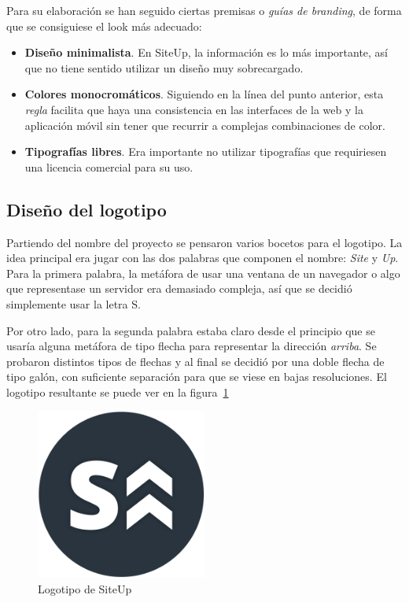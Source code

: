 Para su elaboración se han seguido ciertas premisas o \textit{guías de
  branding}, de forma que se consiguiese el look más adecuado:

\begin{itemize}
\item \textbf{Diseño minimalista}. En SiteUp, la información es lo más
  importante, así que no tiene sentido utilizar un diseño muy sobrecargado.
\item \textbf{Colores monocromáticos}. Siguiendo en la línea del punto anterior,
  esta \textit{regla} facilita que haya una consistencia en las interfaces de la
  web y la aplicación móvil sin tener que recurrir a complejas combinaciones de
  color.
\item \textbf{Tipografías libres}. Era importante no utilizar tipografías que
  requiriesen una licencia comercial para su uso.
\end{itemize}

\subsection{Diseño del logotipo}
\label{subsec:logotipo}

Partiendo del nombre del proyecto se pensaron varios bocetos para el
logotipo. La idea principal era jugar con las dos palabras que componen el
nombre: \textit{Site} y \textit{Up}. Para la primera palabra, la metáfora de
usar una ventana de un navegador o algo que representase un servidor era
demasiado compleja, así que se decidió simplemente usar la letra S. 

Por otro lado, para la segunda palabra estaba claro desde el principio que se
usaría alguna metáfora de tipo flecha para representar la dirección
\textit{arriba}. Se probaron distintos tipos de flechas y al final se decidió
por una doble flecha de tipo galón, con suficiente separación para que se viese
en bajas resoluciones. El logotipo resultante se puede ver en la
figura~\ref{fig:logotipo}

\begin{figure}[H]
  \centering
  \includegraphics[width=0.5\textwidth]{5_diseno/logo.png}
  \caption{Logotipo de SiteUp}
  \label{fig:logotipo}
\end{figure}

